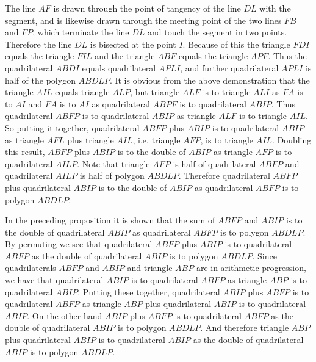 \documentclass[11pt,letterpaper]{book}
\begin{document}

The line $AF$ is drawn through the point of tangency of the line $DL$ with the
segment, and is likewise drawn through the meeting point of the two lines $FB$
and $FP$, which terminate the line $DL$ and touch the segment in two points.
Therefore the line $DL$ is bisected at the point $I$. Because of this the
triangle $FDI$ equals the triangle $FIL$ and the triangle $ABF$ equals the
triangle $APF$. Thus the quadrilateral $ABDI$ equals quadrilateral $APLI$, and
further quadrilateral $APLI$ is half of the polygon $ABDLP$. It is obvious from
the above demonstration that the triangle $AIL$ equals triangle $ALP$, but
triangle $ALF$ is to triangle $ALI$ as $FA$ is to $AI$ and $FA$ is to $AI$ as
quadrilateral $ABPF$ is to quadrilateral $ABIP$. Thus quadrilateral $ABFP$ is to
quadrilateral $ABIP$ as triangle $ALF$ is to triangle $AIL$. So putting it
together, quadrilateral $ABFP$ plus $ABIP$ is to quadrilateral $ABIP$ as
triangle $AFL$ plus triangle $AIL$, i.e. triangle $AFP$, is to triangle $AIL$.
Doubling this result, $ABFP$ plus $ABIP$ is to the double of $ABIP$ as triangle
$AFP$ is to quadrilateral $AILP$. Note that triangle $AFP$ is half of
quadrilateral $ABFP$ and quadrilateral $AILP$ is half of polygon $ABDLP$.
Therefore quadrilateral $ABFP$ plus quadrilateral $ABIP$ is to the double of
$ABIP$ as quadrilateral $ABFP$ is to polygon $ABDLP$.


In the preceding proposition it is shown that the sum of $ABFP$ and $ABIP$ is to
the double of quadrilateral $ABIP$ as quadrilateral $ABFP$ is to polygon
$ABDLP$. By permuting we see that quadrilateral $ABFP$ plus $ABIP$ is to
quadrilateral $ABFP$ as the double of quadrilateral $ABIP$ is to polygon
$ABDLP$. Since quadrilaterals $ABFP$ and $ABIP$ and triangle $ABP$ are in
arithmetic progression, we have that quadrilateral $ABIP$ is to quadrilateral
$ABFP$ as triangle $ABP$ is to quadrilateral $ABIP$. Putting these together,
quadrilateral $ABIP$ plus $ABFP$ is to quadrilateral $ABFP$ as triangle $ABP$
plus quadrilateral $ABIP$ is to quadrilateral $ABIP$. On the other hand $ABIP$
plus $ABFP$ is to quadrilateral $ABFP$ as the double of quadrilateral $ABIP$ is
to polygon $ABDLP$. And therefore triangle $ABP$ plus quadrilateral $ABIP$ is
to quadrilateral $ABIP$ as the double of quadrilateral $ABIP$ is to polygon
$ABDLP$.
\end{document}
